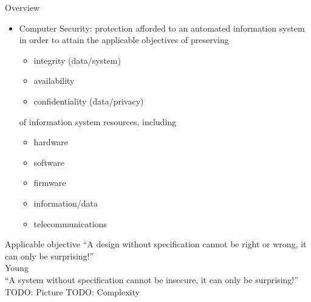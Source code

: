 \documentclass{beamer}
\begin{document}
\begin{frame}{Overview}
  \begin{itemize}
  \item \alert{Computer Security}: protection afforded to an 
    automated information system in order to attain 
    the \alert{applicable objectives} of preserving
    
    \begin{itemize}
    \item integrity (data/system)
    \item availability
    \item confidentiality (data/privacy)
    \end{itemize}
of  information system resources, including
 
\begin{itemize}
  \item hardware
  \item software
  \item firmware
  \item information/data
  \item telecommunications
\end{itemize}
  \end{itemize}
\end{frame}



\begin{frame}{Applicable objective}
``A design without specification cannot be right or wrong,
  it can only be surprising!''
  \\
  Young\\[20pt]
``A system without specification cannot be insecure,
  it can only be surprising!''
  TODO: Picture
  TODO: Complexity
\end{frame}
\end{document}
